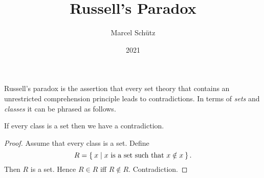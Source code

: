 \documentclass{article}
\title{Russell's Paradox}
\author{Marcel Schütz}
\date{2021}
\begin{document}

  \maketitle


  Russell's paradox is the assertion that every set theory that contains an
  unrestricted comprehension principle leads to contradictions.
  In terms of \textit{sets} and \textit{classes} it can be phrased as follows.

  \begin{forthel}
    \begin{theorem}[Russell]
      If every class is a set then we have a contradiction.
    \end{theorem}
    \begin{proof}
      Assume that every class is a set.
      Define \[ R = \Set{x | \text{$x$ is a set such that $x \notin x$}}. \]
      Then $R$ is a set.
      Hence $R \in R$ iff $R \notin R$.
      Contradiction.
    \end{proof}
  \end{forthel}
\end{document}
